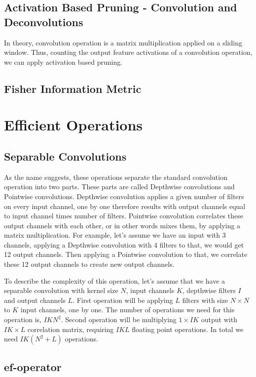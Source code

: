 \subsection{Activation Based Pruning - Convolution and Deconvolutions}
In theory, convolution operation is a matrix multiplication applied on a sliding window. Thus, counting the output feature activations of a convolution operation, we can apply activation based pruning. 

\subsection{Fisher Information Metric}

\section{Efficient Operations}
\subsection{Separable Convolutions}
As the name suggests, these operations separate the standard convolution operation into two parts. These parts are called Depthwise convolutions and Pointwise convolutions. Depthwise convolution applies a given number of filters on every input channel, one by one therefore results with output channels equal to input channel times number of filters. Pointwise convolution correlates these output channels with each other, or in other words mixes them, by applying a matrix multiplication. For example, let's assume we have an input with 3 channels, applying a Depthwise convolution with 4 filters to that, we would get 12 output channels. Then applying a Pointwise convolution to that, we correlate these 12 output channels to create new output channels. 

To describe the complexity of this operation, let's assume that we have a separable convolution with kernel size $N$, input channels $K$, depthwise filters $I$ and output channels $L$. First operation will be applying $L$ filters with size $N \times N$ to $K$ input channels, one by one. The number of operations we need for this operation is, $IKN^2$. Second operation will be multiplying $1 \times IK$ output with $IK \times L$ correlation matrix, requiring $IKL$ floating point operations. In total we need $IK(N^2+L)$ operations. 
\subsection{ef-operator}

